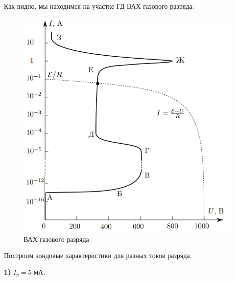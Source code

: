 \documentclass[a4paper,12pt]{article} %
\begin{document}
Как видно, мы находимся на участке ГД ВАХ газового разряда:

\begin{figure}[h!]
	\centering
	\includegraphics[scale=0.71]{Pictures/ВАХ_УЧЕБНИК.png}
	\caption{ВАХ газового разряда}
\end{figure}
\newpage

Построим зондовые характеристики для разных токов разряда.

\noindent \textbf{1)} $I_p = 5$ мА.
\end{document}
